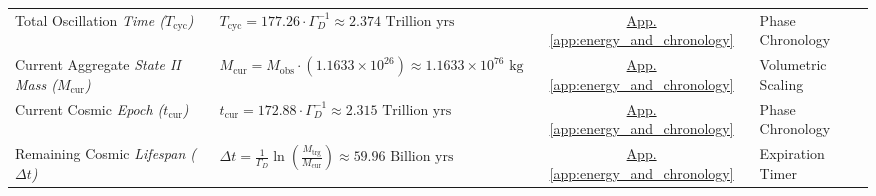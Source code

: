 \begin{longtable}{@{} p{4.5cm} p{6cm} c p{4cm} @{}}
Total Oscillation \newline \textit{Time ($T_{\text{cyc}}$)} & $T_{\text{cyc}} = 177.26 \cdot \Gamma_D^{-1} \approx 2.374 \text{ Trillion yrs}$ & \hyperref[app:energy_and_chronology]{App. \ref*{app:energy_and_chronology}} & Phase Chronology \\

Current Aggregate \newline \textit{State II Mass ($M_{\text{cur}}$)} & $M_{\text{cur}} = M_{\text{obs}} \cdot (1.1633 \times 10^{26}) \approx 1.1633 \times 10^{76} \text{ kg}$ & \hyperref[app:energy_and_chronology]{App. \ref*{app:energy_and_chronology}} & Volumetric Scaling \\

Current Cosmic \newline \textit{Epoch ($t_{\text{cur}}$)} & $t_{\text{cur}} = 172.88 \cdot \Gamma_D^{-1} \approx 2.315 \text{ Trillion yrs}$ & \hyperref[app:energy_and_chronology]{App. \ref*{app:energy_and_chronology}} & Phase Chronology \\

Remaining Cosmic \newline \textit{Lifespan ($\Delta t$)} & $\Delta t = \frac{1}{\Gamma_D} \ln\left(\frac{M_{\text{trg}}}{M_{\text{cur}}}\right) \approx 59.96 \text{ Billion yrs}$ & \hyperref[app:energy_and_chronology]{App. \ref*{app:energy_and_chronology}} & Expiration Timer \\

\bottomrule
\end{longtable}
